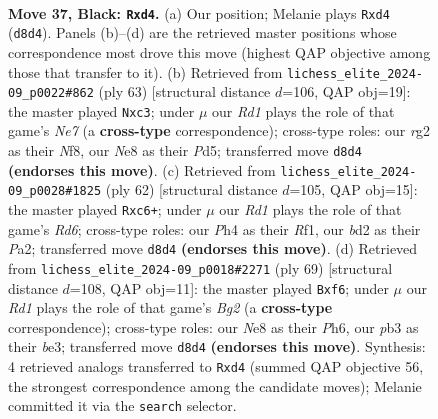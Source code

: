 \documentclass[11pt]{article}
\begin{document}
\clearpage

\begin{figure}[p]\centering
\begin{subfigure}{0.46\textwidth}\centering
\resizebox{\linewidth}{!}{%
\newchessgame
\chessboard[
  setfen={1r1rnk2/p1p5/2P2p2/8/3Q1P1p/1P6/3B1KRP/5BR1 b - - 0 37},
  showmover=false,
  pgfstyle=straightmove, color=movearrow, markmove={d8-d4}
]}
\caption{}
\end{subfigure}\hfill
\begin{subfigure}{0.46\textwidth}\centering
\resizebox{\linewidth}{!}{%
\newchessgame
\chessboard[
  setfen={4rnk1/pp3pP1/6p1/3p2P1/8/2Q5/2BKnP2/6RR b - - 0 32},
  showmover=false,
  pgfstyle=straightmove, color=movearrow, markmove={e2-c3}
]}
\caption{}
\end{subfigure}
\\[4pt]
\begin{subfigure}{0.46\textwidth}\centering
\resizebox{\linewidth}{!}{%
\newchessgame
\chessboard[
  setfen={2k1r3/p3r3/1pqRb2p/8/1B2P2P/2P3p1/P1P3P1/2K2R2 w - - 0 32},
  showmover=false,
  pgfstyle=straightmove, color=movearrow, markmove={d6-c6}
]}
\caption{}
\end{subfigure}\hfill
\begin{subfigure}{0.46\textwidth}\centering
\resizebox{\linewidth}{!}{%
\newchessgame
\chessboard[
  setfen={8/6bk/4PQpp/4p3/r3P3/4B2P/r4PP1/1R2R1K1 b - - 0 35},
  showmover=false,
  pgfstyle=straightmove, color=movearrow, markmove={g7-f6}
]}
\caption{}
\end{subfigure}
\caption{\textbf{Move 37, Black: \texttt{Rxd4}.} (a) Our position; Melanie plays \texttt{Rxd4} (\texttt{d8d4}). Panels (b)--(d) are the retrieved master positions whose correspondence most drove this move (highest QAP objective among those that transfer to it). (b) Retrieved from \texttt{lichess\_elite\_2024-09\_p0022\#862} (ply 63) [structural distance $d$=106, QAP obj=19]: the master played \texttt{Nxc3}; under $\mu$ our \emph{Rd1} plays the role of that game's \emph{Ne7} (a \textbf{cross-type} correspondence); cross-type roles: our \emph{r}g2 as their \emph{N}f8, our \emph{N}e8 as their \emph{P}d5; transferred move \texttt{d8d4} \textbf{(endorses this move)}. (c) Retrieved from \texttt{lichess\_elite\_2024-09\_p0028\#1825} (ply 62) [structural distance $d$=105, QAP obj=15]: the master played \texttt{Rxc6+}; under $\mu$ our \emph{Rd1} plays the role of that game's \emph{Rd6}; cross-type roles: our \emph{P}h4 as their \emph{R}f1, our \emph{b}d2 as their \emph{P}a2; transferred move \texttt{d8d4} \textbf{(endorses this move)}. (d) Retrieved from \texttt{lichess\_elite\_2024-09\_p0018\#2271} (ply 69) [structural distance $d$=108, QAP obj=11]: the master played \texttt{Bxf6}; under $\mu$ our \emph{Rd1} plays the role of that game's \emph{Bg2} (a \textbf{cross-type} correspondence); cross-type roles: our \emph{N}e8 as their \emph{P}h6, our \emph{p}b3 as their \emph{b}e3; transferred move \texttt{d8d4} \textbf{(endorses this move)}. Synthesis: 4 retrieved analogs transferred to \texttt{Rxd4} (summed QAP objective 56, the strongest correspondence among the candidate moves); Melanie committed it via the \texttt{search} selector.}
\label{fig:thought-m73}
\end{figure}
\end{document}

